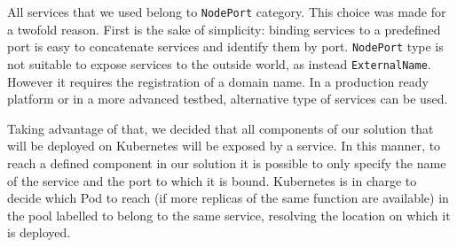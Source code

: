 All services that we used belong to \texttt{NodePort} category. This choice was
made for a twofold reason. First is the sake of simplicity: binding services to
a predefined port is easy to concatenate services and identify them by port.
\texttt{NodePort} type is not suitable to expose services to the outside world,
as instead \texttt{ExternalName}. However it requires the registration of a
domain name. In a production ready platform or in a more advanced testbed,
alternative type of services can be used.

Taking advantage of that, we decided that all components of our solution that
will be deployed on Kubernetes will be exposed by a service. In this manner, to
reach a defined component in our solution it is possible to only specify the
name of the service and the port to which it is bound. Kubernetes is in charge
to decide which Pod to reach (if more replicas of the same function are
available) in the pool labelled to belong to the same service, resolving the
location on which it is deployed.

